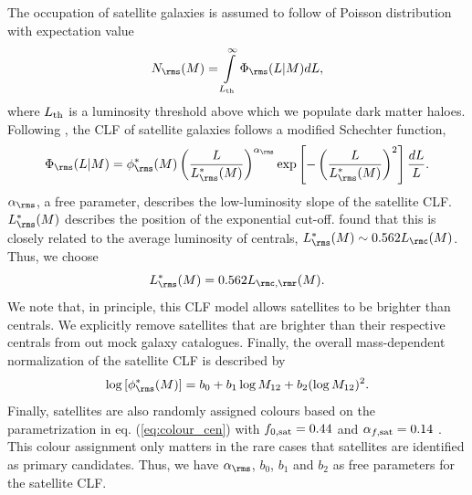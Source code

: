 \documentclass[fleqn,usenatbib,useAMS]{mnras}
\begin{document}
The occupation of satellite galaxies is assumed to follow of Poisson distribution with expectation value
\begin{equation}
N_\rms (M) = \int\limits_{L_{\rm th}}^\infty \Phi_\rms (L | M) dL,
\end{equation}
where $L_{\rm th}$ is a luminosity threshold above which we populate dark matter haloes. Following \cite{Yang+08}, the CLF of satellite galaxies follows a modified Schechter function,
\begin{equation}
\Phi_\rms (L | M) = \phi_\rms^* (M) \left( \frac{L}{L_\rms^*(M)} \right)^{\alpha_\rms} \exp \left[ - \left( \frac{L}{L_\rms^* (M)} \right)^2 \right] \frac{dL}{L}.
\end{equation}
$\alpha_\rms$, a free parameter, describes the low-luminosity slope of the satellite CLF. $L_\rms^* (M)$ describes the position of the exponential cut-off. \cite{Yang+08} found that this is closely related to the average luminosity of centrals, $L_\rms^* (M) \sim 0.562 L_\rmc (M)$. Thus, we choose
\begin{equation}
L_\rms^*(M) = 0.562 L_{\rmc, \rmr} (M).
\end{equation}
We note that, in principle, this CLF model allows satellites to be brighter than centrals. We explicitly remove satellites that are brighter than their respective centrals from out mock galaxy catalogues. Finally, the overall mass-dependent normalization of the satellite CLF is described by
\begin{equation}
\log \left[ \phi_\rms^* (M) \right] = b_0 + b_1 \log M_{12} + b_2 (\log M_{12})^2.
\end{equation}
Finally, satellites are also randomly assigned colours based on the parametrization in eq. (\ref{eq:colour_cen}) with $f_{0, \rm sat} = 0.44$ and $\alpha_{f, \rm sat} = 0.14$ \citep[compare][]{Yang+08}. This colour assignment only matters in the rare cases that satellites are identified as primary candidates. Thus, we have $\alpha_\rms$, $b_0$, $b_1$ and $b_2$ as free parameters for the satellite CLF. 
\end{document}
